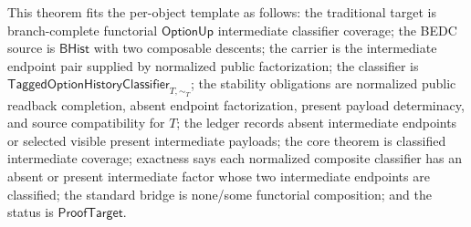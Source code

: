 \begin{theorem}
\label{thm:tagged-option-composite-image-classifier-normalized-intermediate-classifier-coverage}
This theorem fits the per-object template as follows: the traditional target is
branch-complete functorial $\mathsf{OptionUp}$ intermediate classifier
coverage; the BEDC source is $\mathsf{BHist}$ with two composable descents; the
carrier is the intermediate endpoint pair supplied by normalized public
factorization; the classifier is
$\mathsf{TaggedOptionHistoryClassifier}_{T,\sim_T}$; the stability obligations
are normalized public readback completion, absent endpoint factorization,
present payload determinacy, and source compatibility for $T$; the ledger
records absent intermediate endpoints or selected visible present intermediate
payloads; the core theorem is classified intermediate coverage; exactness says
each normalized composite classifier has an absent or present intermediate
factor whose two intermediate endpoints are classified; the standard bridge is
none/some functorial composition; and the status is $\mathsf{ProofTarget}$.


\end{theorem}
